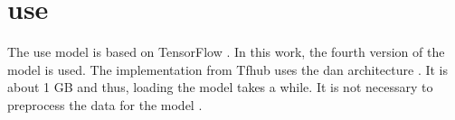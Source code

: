 \section{\ac{use}}\label{sec:impl-use}

The \ac{use} model is based on TensorFlow \cite{HfsentTrans2019}.
In this work, the fourth version of the model is used.
The implementation from Tfhub uses the \ac{dan} architecture \cite{UniversalSentEnc-dev}.
It is about 1 GB and thus, loading the model takes a while.
It is not necessary to preprocess the data for the model \cite{UniversalSentEnc-dev}.